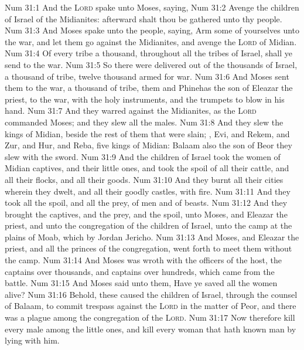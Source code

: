 \vs Num 31:1 And the \textsc{Lord} spake unto Moses, saying,
\vs Num 31:2 Avenge the children of Israel of the Midianites: afterward shalt thou be gathered unto thy people.
\vs Num 31:3 And Moses spake unto the people, saying, Arm some of yourselves unto the war, and let them go against the Midianites, and avenge the \textsc{Lord} of Midian.
\vs Num 31:4 Of every tribe a thousand, throughout all the tribes of Israel, shall ye send to the war.
\vs Num 31:5 So there were delivered out of the thousands of Israel, a thousand of  tribe, twelve thousand armed for war.
\vs Num 31:6 And Moses sent them to the war, a thousand of  tribe, them and Phinehas the son of Eleazar the priest, to the war, with the holy instruments, and the trumpets to blow in his hand.
\vs Num 31:7 And they warred against the Midianites, as the \textsc{Lord} commanded Moses; and they slew all the males.
\vs Num 31:8 And they slew the kings of Midian, beside the rest of them that were slain; , Evi, and Rekem, and Zur, and Hur, and Reba, five kings of Midian: Balaam also the son of Beor they slew with the sword.
\vs Num 31:9 And the children of Israel took  the women of Midian captives, and their little ones, and took the spoil of all their cattle, and all their flocks, and all their goods.
\vs Num 31:10 And they burnt all their cities wherein they dwelt, and all their goodly castles, with fire.
\vs Num 31:11 And they took all the spoil, and all the prey,  of men and of beasts.
\vs Num 31:12 And they brought the captives, and the prey, and the spoil, unto Moses, and Eleazar the priest, and unto the congregation of the children of Israel, unto the camp at the plains of Moab, which  by Jordan  Jericho.
\vs Num 31:13 And Moses, and Eleazar the priest, and all the princes of the congregation, went forth to meet them without the camp.
\vs Num 31:14 And Moses was wroth with the officers of the host,  the captains over thousands, and captains over hundreds, which came from the battle.
\vs Num 31:15 And Moses said unto them, Have ye saved all the women alive?
\vs Num 31:16 Behold, these caused the children of Israel, through the counsel of Balaam, to commit trespass against the \textsc{Lord} in the matter of Peor, and there was a plague among the congregation of the \textsc{Lord}.
\vs Num 31:17 Now therefore kill every male among the little ones, and kill every woman that hath known man by lying with him.
